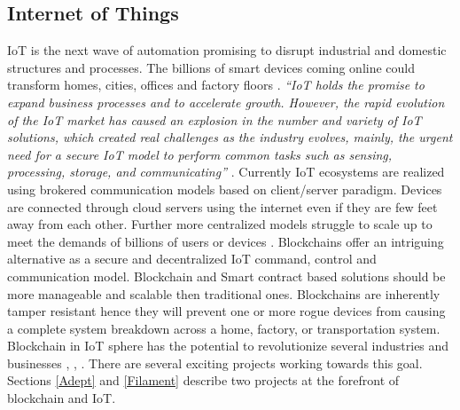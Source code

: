 \subsection{Internet of Things}
IoT is the next wave of automation promising to disrupt industrial and domestic structures and processes. The billions of smart devices coming online could transform homes, cities, offices and factory floors \cite{misc:008}. \textit{“IoT holds the promise to expand business processes and to accelerate growth. However, the rapid evolution of the IoT market has caused an explosion in the number and variety of IoT solutions, which created real challenges as the industry evolves, mainly, the urgent need for a secure IoT model to perform common tasks such as sensing, processing, storage, and communicating”} \cite{misc:002}. Currently IoT ecosystems are realized using brokered communication models based on client/server paradigm. Devices are connected through cloud servers using the internet even if they are few feet away from each other. Further more centralized models struggle to scale up to meet the demands of billions of users or devices \cite{misc:004}. Blockchains offer an intriguing alternative as a secure and decentralized IoT command, control and communication model. Blockchain and Smart contract based solutions should be more manageable and scalable then traditional ones. Blockchains are inherently tamper resistant hence they will prevent one or more rogue devices from causing a complete system breakdown across a home, factory, or transportation system. Blockchain in IoT sphere has the potential to revolutionize several industries and businesses \cite{misc:008}, \cite{misc:004}, \cite{misc:002}. There are several exciting projects working towards this goal. Sections \ref{Adept} and \ref{Filament} describe two projects at the forefront of blockchain and IoT.




